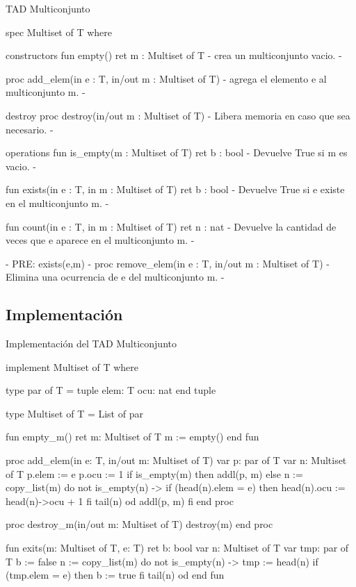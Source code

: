 \begin{codebox}{TAD Multiconjunto}
\begin{pascallike}
spec Multiset of T where

constructors
    fun empty() ret m : Multiset of T
    {- crea un multiconjunto vacio. -}

    proc add_elem(in e : T, in/out m : Multiset of T)
    {- agrega el elemento e al multiconjunto m. -}

destroy
    proc destroy(in/out m : Multiset of T)
    {- Libera memoria en caso que sea necesario. -}

operations
    fun is_empty(m : Multiset of T) ret b : bool
    {- Devuelve True si m es vacio. -}

    fun exists(in e : T, in m : Multiset of T) ret b : bool
    {- Devuelve True si e existe en el multiconjunto m. -}

    fun count(in e : T, in m : Multiset of T) ret n : nat
    {- Devuelve la cantidad de veces que e aparece en el multiconjunto m. -}

    {- PRE: exists(e,m) -}
    proc remove_elem(in e : T, in/out m : Multiset of T)
    {- Elimina una ocurrencia de e del multiconjunto m. -}
\end{pascallike}
\end{codebox}

\subsection{Implementación}

\begin{codebox}{Implementación del TAD Multiconjunto}
\begin{pascallike}
implement Multiset of T where

type par of T = tuple
                    elem: T
                    ocu: nat
                end tuple

type Multiset of T = List of par

fun empty_m() ret m: Multiset of T
    m := empty()
end fun

proc add_elem(in e: T, in/out m: Multiset of T)
    var p: par of T
    var n: Multiset of T
    p.elem := e
    p.ocu := 1
    if is_empty(m) then
        addl(p, m)
    else
        n := copy_list(m)
        do not is_empty(n) -> 
            if (head(n).elem = e) then
                head(n).ocu := head(n)->ocu + 1
            fi
            tail(n)
        od
        addl(p, m)
    fi
end proc

proc destroy_m(in/out m: Multiset of T)
    destroy(m)
end proc

fun exits(m: Multiset of T, e: T) ret b: bool
    var n: Multiset of T
    var tmp: par of T
    b := false
    n := copy_list(m)
    do not is_empty(n) ->
        tmp := head(n)
        if (tmp.elem = e) then
            b := true
        fi
        tail(n)
    od
end fun
\end{pascallike}
\end{codebox}

